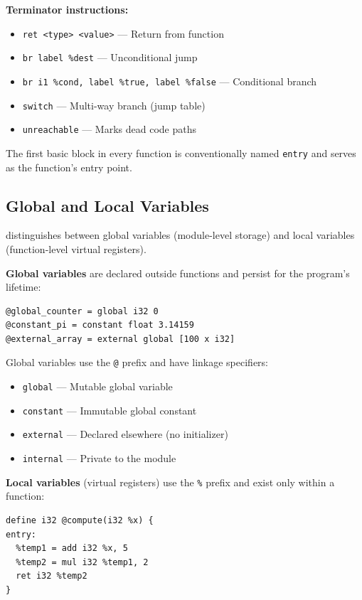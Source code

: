 \textbf{Terminator instructions:}

\begin{itemize}[noitemsep]
  \item \texttt{ret <type> <value>} --- Return from function
  \item \texttt{br label \%dest} --- Unconditional jump
  \item \texttt{br i1 \%cond, label \%true, label \%false} --- Conditional branch
  \item \texttt{switch} --- Multi-way branch (jump table)
  \item \texttt{unreachable} --- Marks dead code paths
\end{itemize}

The first basic block in every function is conventionally named \texttt{entry} and serves as the function's entry point.

\subsection{Global and Local Variables}

 distinguishes between global variables (module-level storage) and local variables (function-level virtual registers).

\textbf{Global variables} are declared outside functions and persist for the program's lifetime:

\begin{lstlisting}[style=ir]
@global_counter = global i32 0
@constant_pi = constant float 3.14159
@external_array = external global [100 x i32]
\end{lstlisting}

Global variables use the \texttt{@} prefix and have linkage specifiers:
\begin{itemize}[noitemsep]
  \item \texttt{global} --- Mutable global variable
  \item \texttt{constant} --- Immutable global constant
  \item \texttt{external} --- Declared elsewhere (no initializer)
  \item \texttt{internal} --- Private to the module
\end{itemize}

\textbf{Local variables} (virtual registers) use the \texttt{\%} prefix and exist only within a function:

\begin{lstlisting}[style=ir]
define i32 @compute(i32 %x) {
entry:
  %temp1 = add i32 %x, 5
  %temp2 = mul i32 %temp1, 2
  ret i32 %temp2
}
\end{lstlisting}

